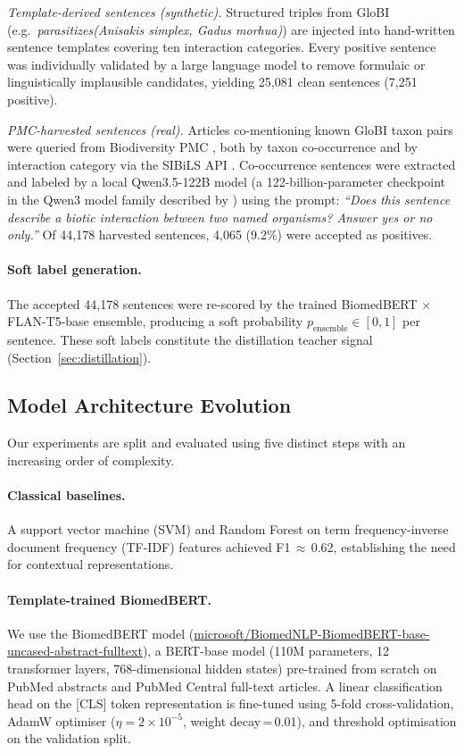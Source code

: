 \documentclass[11pt]{article}
\begin{document}
\emph{Template-derived sentences (synthetic).}
Structured triples from GloBI (e.g.\ \textit{parasitizes(Anisakis simplex,
Gadus morhua)}) are injected into hand-written sentence templates covering
ten interaction categories. Every positive sentence was individually
validated by a large language model to remove formulaic or linguistically
implausible candidates, yielding 25,081 clean sentences (7,251 positive).

\emph{PMC-harvested sentences (real).}
Articles co-mentioning known GloBI taxon pairs were queried from
Biodiversity PMC \citep{biodiversitypmc2024}, both by taxon co-occurrence
and by interaction category via the SIBiLS API \citep{mottin2021sibils}.
Co-occurrence sentences were extracted and labeled by a local Qwen3.5-122B
model (a 122-billion-parameter checkpoint in the Qwen3 model family
described by \citealt{qwen2025technical})
using the prompt:
\textit{``Does this sentence describe a biotic interaction between two named
organisms? Answer yes or no only.''}
Of 44,178 harvested sentences, 4,065 (9.2\%) were accepted as positives.

\paragraph{Soft label generation.}
The accepted 44,178 sentences were re-scored by the trained BiomedBERT
$\times$ FLAN-T5-base ensemble, producing a soft probability
$p_\text{ensemble} \in [0,1]$ per sentence. These soft labels constitute
the distillation teacher signal (Section~\ref{sec:distillation}).

\subsection{Model Architecture Evolution}
\label{sec:architectures}

Our experiments are split and evaluated using five distinct steps with an increasing order of
complexity.

\paragraph{Classical baselines.}
A support vector machine (SVM) and Random Forest on term frequency-inverse
document frequency (TF-IDF) features achieved F1\,$\approx$\,0.62,
establishing the need for contextual representations.

\paragraph{Template-trained BiomedBERT.}
We use the BiomedBERT model \citep{gu2021domain}
(\url{microsoft/BiomedNLP-BiomedBERT-base-uncased-abstract-fulltext}),
a BERT-base model (110M parameters, 12 transformer
layers, 768-dimensional hidden states) pre-trained from scratch on PubMed
abstracts and PubMed Central full-text articles. A linear classification
head on the [CLS] token representation is fine-tuned using 5-fold
cross-validation, AdamW optimiser ($\eta = 2 \times 10^{-5}$, weight
decay\,=\,0.01), and threshold optimisation on the validation split.
\end{document}

